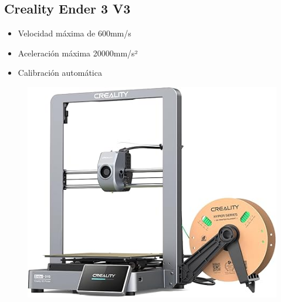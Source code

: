 \documentclass[compacto,5pt,comentarios]{aleph-notas}
\begin{document}
\newpage
\subsection{Creality Ender 3 V3}

\begin{advertencia}
\begin{itemize}
    \item Velocidad máxima de 600mm/s
    \item Aceleración máxima 20000mm/s²
    \item Calibración automática
\end{itemize}
\end{advertencia}

\begin{figure}[h]
    \centering
    \includegraphics[width=0.5\linewidth]{Logos/Ender3V3.jpg}
    \label{fig:enter-label}
\end{figure}
\end{document}
